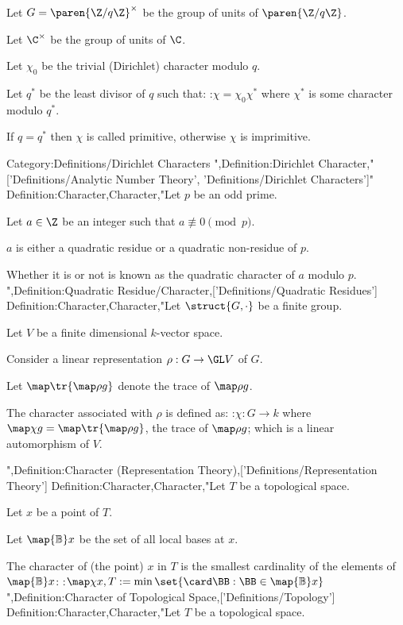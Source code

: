 Let $G = \paren {\Z / q \Z}^\times$ be the group of units of $\paren {\Z / q \Z}$.

Let $\C^\times$ be the group of units of $\C$.


Let $\chi_0$ be the trivial (Dirichlet) character modulo $q$.

Let $q^*$ be the least divisor of $q$ such that:
:$\chi = \chi_0 \chi^*$
where $\chi^*$ is some character modulo $q^*$.

If $q = q^*$ then $\chi$ is called primitive, otherwise $\chi$ is imprimitive.



Category:Definitions/Dirichlet Characters
",Definition:Dirichlet Character,"['Definitions/Analytic Number Theory', 'Definitions/Dirichlet Characters']"
Definition:Character,Character,"Let $p$ be an odd prime.

Let $a \in \Z$ be an integer such that $a \not \equiv 0 \pmod p$.


$a$ is either a quadratic residue or a quadratic non-residue of $p$.

Whether it is or not is known as the quadratic character of $a$ modulo $p$.
",Definition:Quadratic Residue/Character,['Definitions/Quadratic Residues']
Definition:Character,Character,"Let $\struct {G, \cdot}$ be a finite group.

Let $V$ be a finite dimensional  $k$-vector space.

Consider a linear representation $\rho: G \to \GL V$ of $G$.



Let $\map \tr {\map \rho g}$ denote the trace of $\map \rho g$.


The character associated with $\rho$ is defined as:
:$\chi: G \to k$
where $\map \chi g = \map \tr {\map \rho g}$, the trace of $\map \rho g$; which is a linear automorphism of $V$.

",Definition:Character (Representation Theory),['Definitions/Representation Theory']
Definition:Character,Character,"Let $T$ be a topological space.

Let $x$ be a point of $T$.

Let $\map {\mathbb B} x$ be the set of all local bases at $x$.


The character of (the point) $x$ in $T$ is the smallest cardinality of the elements of $\map {\mathbb B} x$:
:$\map \chi {x, T} := \min \set {\card \BB: \BB \in \map {\mathbb B} x}$
",Definition:Character of Topological Space,['Definitions/Topology']
Definition:Character,Character,"Let $T$ be a topological space.

